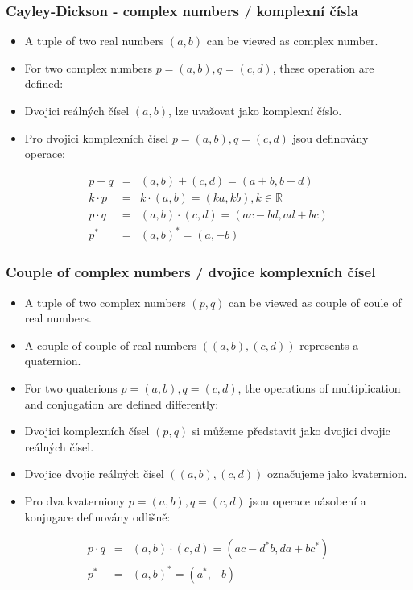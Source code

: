 \begin{frame}\frametitle{Cayley-Dickson - complex numbers / komplexní čísla}\scriptsize
	\begin{itemize}
	\item A tuple of two real numbers $(a,b)$ can be viewed as complex number.
	\item For two complex numbers $p=(a,b),q=(c,d)$, these operation are defined:
	\end{itemize} 
	\begin{itemize}
	\item Dvojici reálných čísel $(a,b)$, lze uvažovat jako komplexní číslo.
	\item Pro dvojici komplexních čísel $p=(a,b),q=(c,d)$ jsou definovány operace:
	\end{itemize} 
\begin{eqnarray*}
p+q&=& (a,b)+(c,d)=(a+b,b+d)\\
k\cdot p &=& k\cdot (a,b)=(ka,kb),k \in \mathbb{R}\\
p\cdot q &=& (a,b) \cdot (c,d) = (ac-bd,ad+bc)\\
p^*&=&(a,b)^*=(a,-b)
\end{eqnarray*}
\end{frame}

\begin{frame}\frametitle{Couple of complex numbers / dvojice komplexních čísel}\scriptsize
	\begin{itemize}
	\item A tuple of two complex numbers $(p,q)$ can be viewed as couple of coule of real numbers.
	\item A couple of couple of real numbers $((a,b),(c,d))$ represents a quaternion.
	\item For two quaterions $p=(a,b),q=(c,d)$, the operations of multiplication and conjugation are defined differently:
	\end{itemize} 
	\begin{itemize}
	\item Dvojici komplexních čísel $(p,q)$ si můžeme představit jako dvojici dvojic reálných čísel.
	\item Dvojice dvojic reálných čísel $((a,b),(c,d))$ označujeme jako kvaternion.
	\item Pro dva kvaterniony $p=(a,b),q=(c,d)$ jsou operace násobení a konjugace definovány odlišně:
	\end{itemize} 
\begin{eqnarray*}
p\cdot q &=& (a,b) \cdot (c,d) = (ac-d^*b,da+bc^*)\\
p^*&=&(a,b)^*=(a^*,-b)
\end{eqnarray*}
\end{frame}

